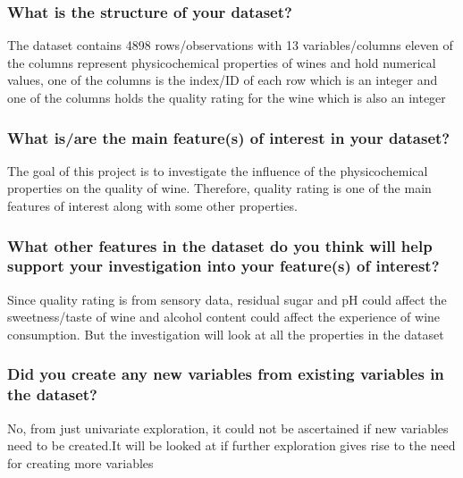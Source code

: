 \documentclass[]{article}
\begin{document}
\subsubsection{What is the structure of your
dataset?}\label{what-is-the-structure-of-your-dataset}

The dataset contains 4898 rows/observations with 13 variables/columns
eleven of the columns represent physicochemical properties of wines and
hold numerical values, one of the columns is the index/ID of each row
which is an integer and one of the columns holds the quality rating for
the wine which is also an integer

\subsubsection{What is/are the main feature(s) of interest in your
dataset?}\label{what-isare-the-main-features-of-interest-in-your-dataset}

The goal of this project is to investigate the influence of the
physicochemical properties on the quality of wine. Therefore, quality
rating is one of the main features of interest along with some other
properties.

\subsubsection{What other features in the dataset do you think will help
support your investigation into your feature(s) of
interest?}\label{what-other-features-in-the-dataset-do-you-think-will-help-support-your-investigation-into-your-features-of-interest}

Since quality rating is from sensory data, residual sugar and pH could
affect the sweetness/taste of wine and alcohol content could affect the
experience of wine consumption. But the investigation will look at all
the properties in the dataset

\subsubsection{Did you create any new variables from existing variables
in the
dataset?}\label{did-you-create-any-new-variables-from-existing-variables-in-the-dataset}

No, from just univariate exploration, it could not be ascertained if new
variables need to be created.It will be looked at if further exploration
gives rise to the need for creating more variables
\end{document}
